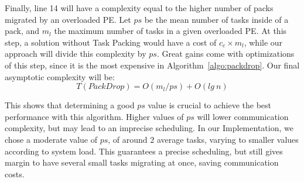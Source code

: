 Finally, line 14 will have a complexity equal to the higher number of packs migrated by an overloaded PE. %
Let $ps$ be the mean number of tasks inside of a pack, and $m_l$ the maximum number of tasks in a given overloaded PE.
At this step, a solution without Task Packing would have a cost of $c_c\times m_l$, while our approach will divide this complexity by $ps$. 
Great gains come with optimizations of this step, since it is the most expensive in Algorithm~\ref{algo:packdrop}.
Our final asymptotic complexity will be:
\begin{equation}
 T(PackDrop) = O(m_l/ps) + O(lg\ n)
 \label{eq:worstcase}
\end{equation}

This shows that determining a good $ps$ value is crucial to achieve the best performance with this algorithm.
Higher values of $ps$ will lower communication complexity, but may lead to an imprecise scheduling.
In our Implementation, we chose a moderate value of $ps$, of around $2$ average tasks, varying to smaller values according to system load.
This guarantees a precise scheduling, but still gives margin to have several small tasks migrating at once, saving communication costs.
